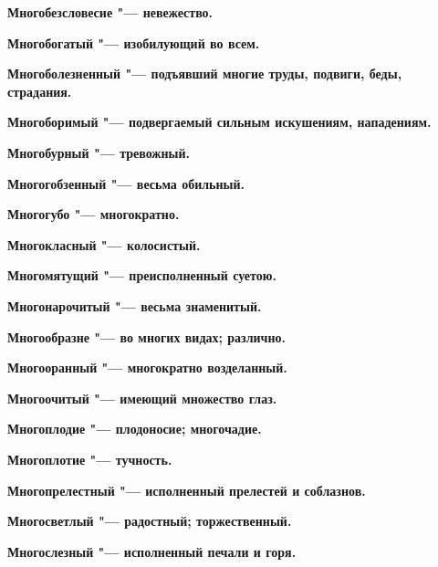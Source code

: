 \begin{multicols}{2}
\bfseries Многобезсловесие\normalfont{} "--- невежество. 




\bfseries Многобогатый\normalfont{} "--- изобилующий во всем. 




\bfseries Многоболезненный\normalfont{} "--- подъявший многие труды, подвиги, беды, страдания. 




\bfseries Многоборимый\normalfont{} "--- подвергаемый сильным искушениям, нападениям. 




\bfseries Многобурный\normalfont{} "--- тревожный. 




\bfseries Многогобзенный\normalfont{} "--- весьма обильный. 




\bfseries Многогубо\normalfont{} "--- многократно. 




\bfseries Многокласный\normalfont{} "--- колосистый. 




\bfseries Многомятущий\normalfont{} "--- преисполненный суетою. 




\bfseries Многонарочитый\normalfont{} "--- весьма знаменитый. 




\bfseries Многообразне\normalfont{} "--- во многих видах; различно. 




\bfseries Многооранный\normalfont{} "--- многократно возделанный. 




\bfseries Многоочитый\normalfont{} "--- имеющий множество глаз. 




\bfseries Многоплодие\normalfont{} "--- плодоносие; многочадие. 




\bfseries Многоплотие\normalfont{} "--- тучность. 




\bfseries Многопрелестный\normalfont{} "--- исполненный прелестей и соблазнов. 




\bfseries Многосветлый\normalfont{} "--- радостный; торжественный. 




\bfseries Многослезный\normalfont{} "--- исполненный печали и горя. 





\end{multicols}
